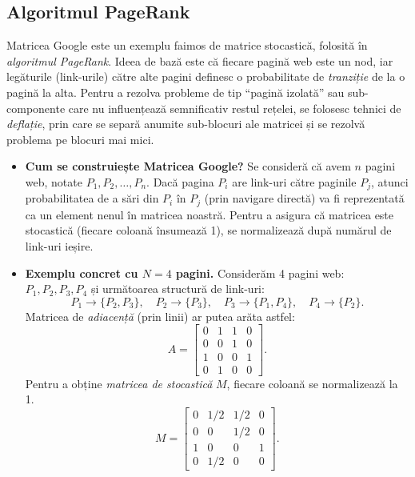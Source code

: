 \documentclass{exam}
\begin{document}
\subsection{Algoritmul PageRank}

Matricea Google este un exemplu faimos de matrice stocastică, folosită în
\textit{algoritmul PageRank}. Ideea de bază este că fiecare pagină web este un
nod, iar legăturile (link-urile) către alte pagini definesc o probabilitate de
\textit{tranziție} de la o pagină la alta. Pentru a rezolva probleme de tip
“pagină izolată” sau sub-componente care nu influențează semnificativ restul
rețelei, se folosesc tehnici de \textit{deflație}, prin care se separă anumite
sub-blocuri ale matricei și se rezolvă problema pe blocuri mai mici.

\begin{itemize}
	\item \textbf{Cum se construiește Matricea Google?} Se consideră că avem $n$
	      pagini web, notate $P_1, P_2, \ldots, P_n$. Dacă pagina $P_i$ are link-uri
	      către paginile $P_j$, atunci probabilitatea de a sări din $P_i$ în $P_j$
	      (prin navigare directă) va fi reprezentată ca un element nenul în matricea
	      noastră. Pentru a asigura că matricea este stocastică
	      (fiecare coloană însumează 1), se normalizează după numărul de link-uri
	      ieșire.

	\item \textbf{Exemplu concret cu $N=4$ pagini.} Considerăm 4 pagini web:
	      $P_1, P_2, P_3, P_4$ și următoarea structură de link-uri:
	      \begin{equation*}
		      P_1 \to \{P_2, P_3\}, \quad
		      P_2 \to \{P_3\}, \quad
		      P_3 \to \{P_1, P_4\}, \quad
		      P_4 \to \{P_2\}.
	      \end{equation*}
	      Matricea de \emph{adiacență} (prin linii) ar putea arăta astfel:
	      \begin{equation*}
		      A = \begin{bmatrix}
			      0 & 1 & 1 & 0 \\
			      0 & 0 & 1 & 0 \\
			      1 & 0 & 0 & 1 \\
			      0 & 1 & 0 & 0
		      \end{bmatrix}.
	      \end{equation*}
	      Pentru a obține \emph{matricea de stocastică} $M$, fiecare
	      coloană se normalizează la 1.
	      \begin{equation*}
		      M = \begin{bmatrix}
			      0 & 1/2 & 1/2 & 0 \\
			      0 & 0   & 1/2 & 0 \\
			      1 & 0   & 0   & 1 \\
			      0 & 1/2 & 0   & 0
		      \end{bmatrix}.
	      \end{equation*}


\end{itemize}
\end{document}
